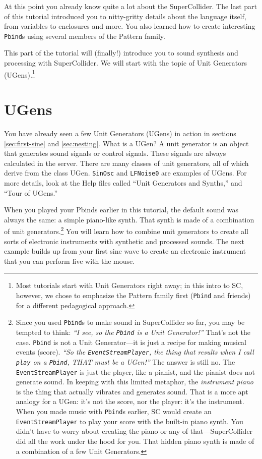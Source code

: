 At this point you already know quite a lot about the SuperCollider. The last part of this tutorial introduced you to nitty-gritty details about the language itself, from variables to enclosures and more. You also learned how to create interesting \texttt{Pbind}s using several members of the Pattern family.

This part of the tutorial will (finally!) introduce you to sound synthesis and processing with SuperCollider. We will start with the topic of Unit Generators (UGens).\footnote{Most tutorials start with Unit Generators right away; in this intro to SC, however, we chose to emphasize the Pattern family first (\texttt{Pbind} and friends) for a different pedagogical approach.}

\section{UGens}

You have already seen a few Unit Generators (UGens) in action in sections \ref{sec:first-sine} and \ref{sec:nesting}. What is a UGen? A unit generator is an object that generates sound signals or control signals. These signals are always calculated in the server. There are many classes of unit generators, all of which derive from the class UGen. \texttt{SinOsc} and \texttt{LFNoise0} are examples of UGens. For more details, look at the Help files called ``Unit Generators and Synths,'' and ``Tour of UGens.'' 

When you played your Pbinds earlier in this tutorial, the default sound was always the same: a simple piano-like synth. That synth is made of a combination of unit generators.\footnote{Since you used \texttt{Pbind}s to make sound in SuperCollider so far, you may be tempted to think: \textit{``I see, so the \texttt{Pbind} is a Unit Generator!''} That's not the case. \texttt{Pbind} is not a Unit Generator---it is just a recipe for making musical events (score). \textit{``So the \texttt{EventStreamPlayer}, the thing that results when I call \texttt{play} on a \texttt{Pbind}, THAT must be a UGen!''} The answer is still no. The \texttt{EventStreamPlayer} is just the player, like a pianist, and the pianist does not generate sound. In keeping with this limited metaphor, the \emph{instrument piano} is the thing that actually vibrates and generates sound. That is a more apt analogy for a UGen: it's not the score, nor the player: it's the instrument. When you made music with \texttt{Pbind}s earlier, SC would create an \texttt{EventStreamPlayer} to play your score with the built-in piano synth. You didn't have to worry about creating the piano or any of that---SuperCollider did all the work under the hood for you. That hidden piano synth is made of a combination of a few Unit Generators.} You will learn how to combine unit generators to create all sorts of electronic instruments with synthetic and processed sounds. The next example builds up from your first sine wave to create an electronic instrument that you can perform live with the mouse.


